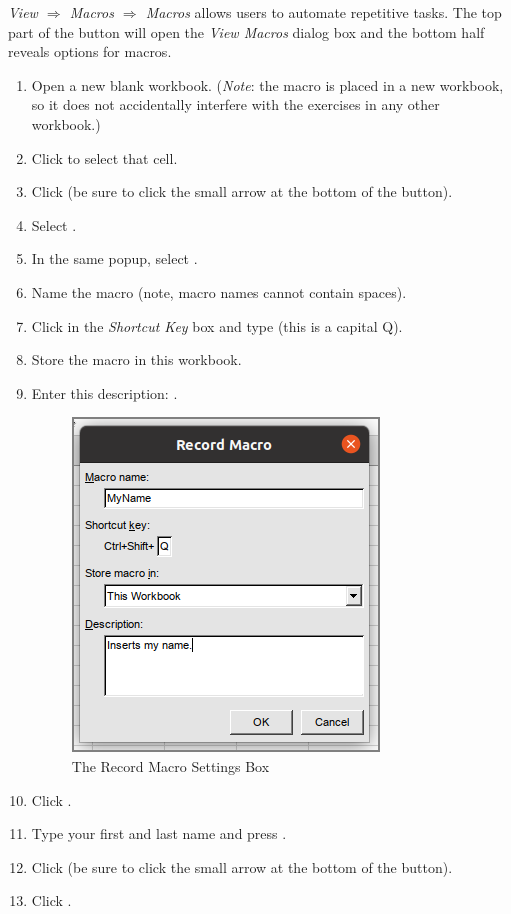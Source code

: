 \textit{View $ \Rightarrow $ Macros $ \Rightarrow $ Macros} allows users to automate repetitive tasks. The top part of the button will open the \textit{View Macros} dialog box and the bottom half reveals options for macros. 

\begin{enumbox}
	\begin{enumerate}
		\item Open a new blank workbook. (\textit{Note}: the macro is placed in a new workbook, so it does not accidentally interfere with the exercises in any other workbook.)
		\item Click  to select that cell.
		\item Click  (be sure to click the small arrow at the bottom of the  button).
		\item Select .
		\item In the same popup, select .
		\item Name the macro  (note, macro names cannot contain spaces).
		\item Click in the \textit{Shortcut Key} box and type  (this is a capital Q). 
		\item Store the macro in this workbook.
		\item Enter this description: .

		\begin{figure}[H]
			\centering
			\includegraphics[width=\maxwidth{.60\linewidth}]{gfx/ch09_fig65}
			\caption{The Record Macro Settings Box}
			\label{09:fig65}
		\end{figure}

		\item Click .
		\item Type your first and last name and press .
		\item Click  (be sure to click the small arrow at the bottom of the  button).
		\item Click .
	\end{enumerate}
\end{enumbox}

